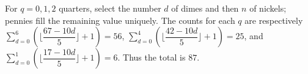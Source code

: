 For $ q=0,1,2 $ quarters, select the number $ d $ of dimes and then $ n $ of nickels; pennies fill the remaining value uniquely. The counts for each $ q $ are respectively $\sum_{d=0}^{6}(\lfloor\dfrac{67-10d}{5}\rfloor+1)=56 $, $\sum_{d=0}^{4}(\lfloor\dfrac{42-10d}{5}\rfloor+1)=25 $, and $\sum_{d=0}^{1}(\lfloor\dfrac{17-10d}{5}\rfloor+1)=6 $. Thus the total is $\boxed{87}$.
